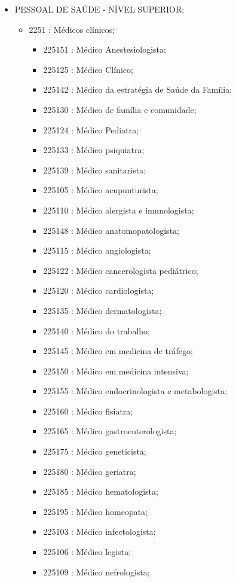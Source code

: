 
\begin{itemize}
  \item PESSOAL DE SAÚDE - NÍVEL SUPERIOR;
  \begin{itemize}
    \item 2251 : Médicos clínicos;
    \begin{itemize}
      \item 225151 : Médico Anestesiologista;
      \item 225125 : Médico Clínico;
      \item 225142 : Médico da estratégia de Saúde da Família;
      \item 225130 : Médico de família e comunidade;
      \item 225124 : Médico Pediatra;
      \item 225133 : Médico psiquiatra;
      \item 225139 : Médico sanitarista;
      \item 225105 : Médico acupunturista;
      \item 225110 : Médico alergista e imunologista;
      \item 225148 : Médico anatomopatologista;
      \item 225115 : Médico angiologista;
      \item 225122 : Médico cancerologista pediátrico;
      \item 225120 : Médico cardiologista;
      \item 225135 : Médico dermatologista;
      \item 225140 : Médico do trabalho;
      \item 225145 : Médico em medicina de tráfego;
      \item 225150 : Médico em medicina intensiva;
      \item 225155 : Médico endocrinologista e metabologista;
      \item 225160 : Médico fisiatra;
      \item 225165 : Médico gastroenterologista;
      \item 225175 : Médico geneticista;
      \item 225180 : Médico geriatra;
      \item 225185 : Médico hematologista;
      \item 225195 : Médico homeopata;
      \item 225103 : Médico infectologista;
      \item 225106 : Médico legista;
      \item 225109 : Médico nefrologista;

\end{itemize}
\end{itemize}
\end{itemize}
